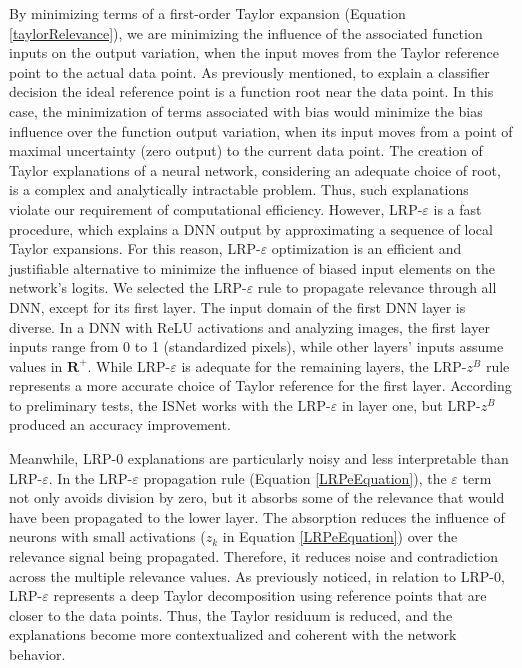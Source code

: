 \documentclass[fleqn,10pt]{wlscirep}
\begin{document}
{By minimizing terms of a first-order Taylor expansion (Equation \ref{taylorRelevance}), we are minimizing the influence of the associated function inputs on the output variation, when the input moves from the Taylor reference point to the actual data point. As previously mentioned, to explain a classifier decision the ideal reference point is a function root near the data point. In this case, the minimization of terms associated with bias would minimize the bias influence over the function output variation, when its input moves from a point of maximal uncertainty (zero output) to the current data point. The creation of Taylor explanations of a neural network, considering an adequate choice of root, is a complex and analytically intractable problem. Thus, such explanations violate our requirement of computational efficiency. However, LRP-$\varepsilon$ is a fast procedure, which explains a DNN output by approximating a sequence of local Taylor expansions. For this reason, LRP-$\varepsilon$ optimization is an efficient and justifiable alternative to minimize the influence of biased input elements on the network's logits. We selected the LRP-$\varepsilon$ rule to propagate relevance through all DNN, except for its first layer. The input domain of the first DNN layer is diverse. In a DNN with ReLU activations and analyzing images, the first layer inputs range from 0 to 1 (standardized pixels), while other layers' inputs assume values in $\mathbf{R}^{+}$. While LRP-$\varepsilon$ is adequate for the remaining layers, the LRP-$z^{B}$ rule represents a more accurate choice of Taylor reference for the first layer\cite{LRPZb}. According to preliminary tests, the ISNet works with the LRP-$\varepsilon$ in layer one, but LRP-$z^{B}$ produced an accuracy improvement.

Meanwhile, LRP-0 explanations are particularly noisy and less interpretable than LRP-$\varepsilon$. In the LRP-$\varepsilon$ propagation rule (Equation \ref{LRPeEquation}), the $\varepsilon$ term not only avoids division by zero, but it absorbs some of the relevance that would have been propagated to the lower layer. The absorption reduces the influence of neurons with small activations ($z_{k}$ in Equation \ref{LRPeEquation}) over the relevance signal being propagated. Therefore, it reduces noise and contradiction across the multiple relevance values\cite{LRPBook}. As previously noticed, in relation to LRP-0, LRP-$\varepsilon$ represents a deep Taylor decomposition using reference points that are closer to the data points. Thus, the Taylor residuum is reduced, and the explanations become more contextualized and coherent with the network behavior\cite{LRPBook}.

}
\end{document}
